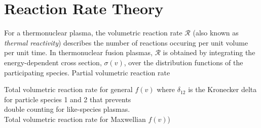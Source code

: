 \section{Reaction Rate Theory}
For a thermonuclear plasma, the volumetric reaction rate $\mathcal{R}$
(also known as \textit{thermal reactivity}) describes the number of
reactions occuring per unit volume per unit time.  In thermonuclear
fusion plasmas, $\mathcal{R}$ is obtained by integrating the
energy-dependent cross section, $\sigma(v)$, over the distribution
functions of the participating species. 
\newline
\newline
\noindent
Partial volumetric reaction rate 

\noindent
Total volumetric reaction rate for general $f(v)$ 
\indent where $\delta_{12}$ is the Kronecker delta for particle species 1 and 2 that prevents \\
\indent double counting for like-species plasmas.\\

\noindent
Total volumetric reaction rate for Maxwellian $f(v)$)   


\vfill

\pagebreak
